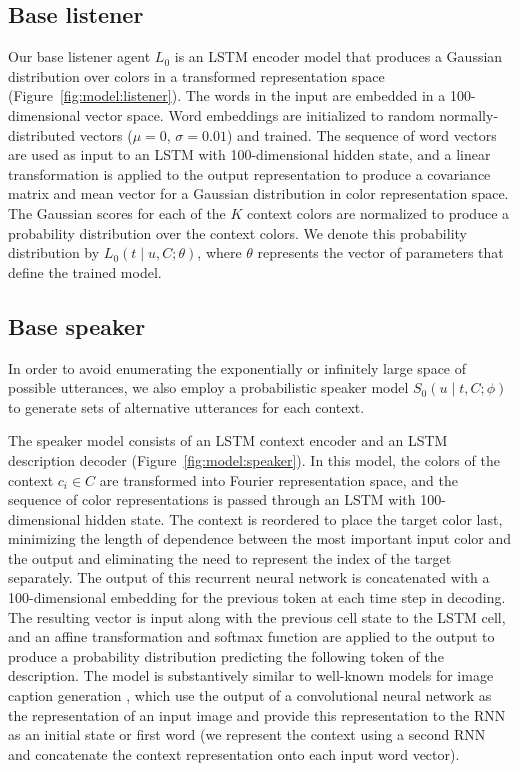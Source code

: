 \documentclass[11pt,letterpaper]{article}
\newcommand{\Listener}{L}
\newcommand{\Speaker}{S}
\newcommand{\utt}{u}
\newcommand{\referent}{c}
\newcommand{\context}{C}
\newcommand{\contextlen}{K}
\newcommand{\target}{t}
\renewcommand{\|}{\mid}
\newcommand{\figref}[1]{Figure~\ref{#1}}
\begin{document}
\subsection{Base listener}

Our base listener agent $\Listener_0$ is an LSTM encoder model that produces a Gaussian
distribution over colors in a transformed representation space (\figref{fig:model:listener}).
The words in the input are embedded in a 100-dimensional vector space. Word embeddings
are initialized to random normally-distributed vectors ($\mu = 0$, $\sigma = 0.01$)
and trained. The sequence of word vectors are
used as input to an LSTM with 100-dimensional hidden state, and a linear
transformation is applied to the output representation to produce a covariance matrix
and mean vector for a Gaussian distribution in color representation space.
The Gaussian scores for each of the $\contextlen$ context colors are normalized to
produce a probability distribution over the context colors. We denote this probability
distribution by $\Listener_0(\target \| \utt, \context; \theta)$, where $\theta$ represents the
vector of parameters that define the trained model.

\subsection{Base speaker}\label{sec:s0}

In order to avoid enumerating the exponentially or infinitely large space of possible utterances,
we also employ a probabilistic speaker model
$\Speaker_0(\utt \| \target, \context; \phi)$ to generate sets of alternative
utterances for each context.

The speaker model consists of an LSTM context encoder
and an LSTM description decoder (\figref{fig:model:speaker}). In this model, the colors of the context
$\referent_i \in \context$ are transformed into Fourier representation space,
and the sequence of color representations is passed through an LSTM with
100-dimensional hidden state. The context is reordered to place the target color
last, minimizing the length of dependence between the most important input color
and the output \cite{Sutskever2014} and eliminating the need to represent the
index of the target separately.
The output of this recurrent neural network is concatenated with a
100-dimensional embedding for the previous token at each time step in decoding.
The resulting vector is input along with the previous cell state to the LSTM cell,
and an affine transformation and softmax function are applied to the output to
produce a probability distribution predicting the following token of the description.
The model is substantively similar to well-known models for image caption generation
\cite{Karpathy2015,Vinyals2015}, which use the output of a convolutional neural
network as the representation of an input image and provide this representation
to the RNN as an initial state or first word (we represent the context using
a second RNN and concatenate the context representation onto each input word vector).
\end{document}
